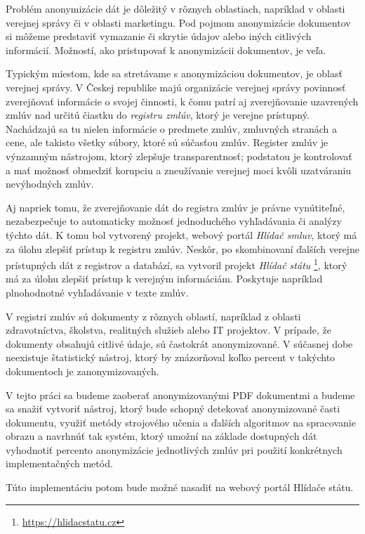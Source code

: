 
Problém anonymizácie dát je dôležitý v rôznych oblastiach, napríklad v oblasti verejnej správy či
v oblasti marketingu. Pod pojmom anonymizácie dokumentov si môžeme predstaviť vymazanie či skrytie údajov 
alebo iných citlivých informácií. Možností, ako pristupovať k anonymizácii dokumentov, je veľa. 

Typickým miestom, kde sa stretávame s anonymizáciou dokumentov, je oblasť verejnej správy.
V Českej republike majú organizácie verejnej správy povinnosť zverejňovať informácie o svojej činnosti,
k čomu patrí aj zverejňovanie uzavrených zmlúv nad určitú čiastku do \textit{registru zmlúv}, 
ktorý je verejne prístupný. Nachádzajú sa tu nielen informácie o predmete zmlúv, zmluvných stranách a cene,
ale takisto všetky súbory, ktoré sú súčasťou zmlúv. Register zmlúv je výnzamným nástrojom, ktorý zlepšuje 
transparentnosť; podstatou je kontrolovať a mať možnosť obmedziť korupciu a zneužívanie verejnej moci 
kvôli uzatváraniu nevýhodných zmlúv.

Aj napriek tomu, že zverejňovanie dát do registra zmlúv je právne vynútiteľné, nezabezpečuje to automaticky
možnosť jednoduchého vyhľadávania či analýzy týchto dát. K tomu bol vytvorený projekt, webový portál 
\textit{Hlídač smluv}, ktorý má za úlohu zlepšiť prístup k registru zmlúv. Neskôr, po skombinovaní ďalších 
verejne prístupných dát z registrov a databází, sa vytvoril projekt \textit{Hlídač státu}
\footnote{\url{https://hlidacstatu.cz}}, ktorý má za úlohu zlepšiť prístup k verejným informáciám. Poskytuje
napríklad plnohodnotné vyhľadávanie v texte zmlúv.

V registri zmlúv sú dokumenty z rôznych oblastí, napríklad z oblasti zdravotníctva, školstva, realitných služieb alebo
IT projektov. V prípade, že dokumenty obsahujú citlivé údaje, sú častokrát anonymizované. V súčasnej dobe neexistuje 
štatistický nástroj, ktorý by znázorňoval koľko percent v takýchto dokumentoch je zanonymizovaných.

V tejto práci sa budeme zaoberať anonymizovanými PDF dokumentmi a budeme sa snažiť vytvoriť nástroj, 
ktorý bude schopný detekovať anonymizované časti dokumentu, využiť metódy strojového učenia a ďalších algoritmov na 
spracovanie obrazu a navrhnúť tak systém, ktorý umožní na základe dostupných dát vyhodnotiť percento anonymizácie 
jednotlivých zmlúv pri použití konkrétnych implementačných metód.

Túto implementáciu potom bude možné nasadiť na webový portál Hlídače státu.

